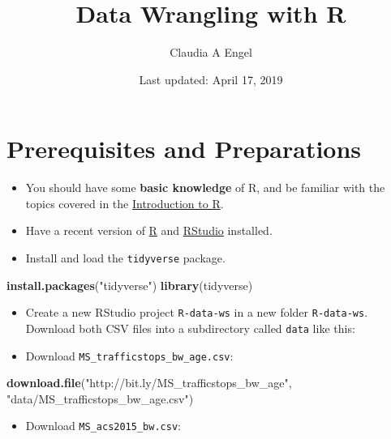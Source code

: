\documentclass[]{book}
\title{Data Wrangling with R}
\author{Claudia A Engel}
\date{Last updated: April 17, 2019}
\newenvironment{Shaded}{\begin{snugshade}}{\end{snugshade}}
\newcommand{\KeywordTok}[1]{\textcolor[rgb]{0.13,0.29,0.53}{\textbf{#1}}}
\newcommand{\NormalTok}[1]{#1}
\newcommand{\StringTok}[1]{\textcolor[rgb]{0.31,0.60,0.02}{#1}}
\providecommand{\tightlist}{%
  \setlength{\itemsep}{0pt}\setlength{\parskip}{0pt}}
\begin{document}
\maketitle

{
\setcounter{tocdepth}{1}
\tableofcontents
}
\hypertarget{prerequisites-and-preparations}{%
\chapter*{Prerequisites and Preparations}\label{prerequisites-and-preparations}}

\begin{itemize}
\tightlist
\item
  You should have some \textbf{basic knowledge} of R, and be familiar with the topics covered in the \href{https://cengel.github.io/R-intro/}{Introduction to R}.
\item
  Have a recent version of \href{https://cran.r-project.org/}{R} and \href{https://www.rstudio.com/}{RStudio} installed.
\item
  Install and load the \texttt{tidyverse} package.
\end{itemize}

\begin{Shaded}
\begin{Highlighting}[]
\KeywordTok{install.packages}\NormalTok{(}\StringTok{"tidyverse"}\NormalTok{)  }
\KeywordTok{library}\NormalTok{(tidyverse)}
\end{Highlighting}
\end{Shaded}

\begin{itemize}
\tightlist
\item
  Create a new RStudio project \texttt{R-data-ws} in a new folder \texttt{R-data-ws}. Download both CSV files into a subdirectory called \texttt{data} like this:
\item
  Download \texttt{MS\_trafficstops\_bw\_age.csv}:
\end{itemize}

\begin{Shaded}
\begin{Highlighting}[]
\KeywordTok{download.file}\NormalTok{(}\StringTok{"http://bit.ly/MS_trafficstops_bw_age"}\NormalTok{,}
              \StringTok{"data/MS_trafficstops_bw_age.csv"}\NormalTok{)}
\end{Highlighting}
\end{Shaded}

\begin{itemize}
\tightlist
\item
  Download \texttt{MS\_acs2015\_bw.csv}:
\end{itemize}
\end{document}

